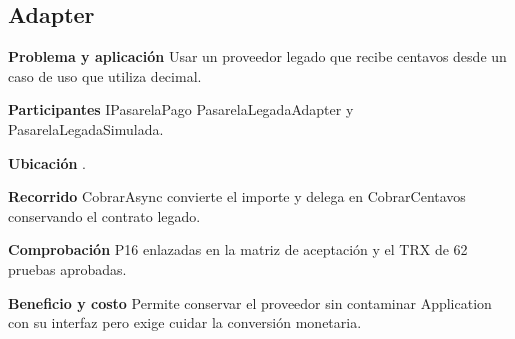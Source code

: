 \noindent\begin{minipage}{\linewidth}
\subsection{Adapter}
\textbf{Problema y aplicación} Usar un proveedor legado que recibe centavos desde un caso de uso que utiliza decimal.

\textbf{Participantes} IPasarelaPago PasarelaLegadaAdapter y PasarelaLegadaSimulada.

\textbf{Ubicación} \href{https://github.com/Alan77-bot/LogiMarket360Alan/blob/68bda51063441415524ede51bdf61649ee9b4973/LogiMarket.Infrastructure/Pagos/PasarelaLegadaAdapter.cs#L7}{}.

\textbf{Recorrido} CobrarAsync convierte el importe y delega en CobrarCentavos conservando el contrato legado.


\textbf{Comprobación} P16 enlazadas en la matriz de aceptación y el TRX de 62 pruebas aprobadas.

\textbf{Beneficio y costo} Permite conservar el proveedor sin contaminar Application con su interfaz pero exige cuidar la conversión monetaria.

\end{minipage}\par\smallskip
